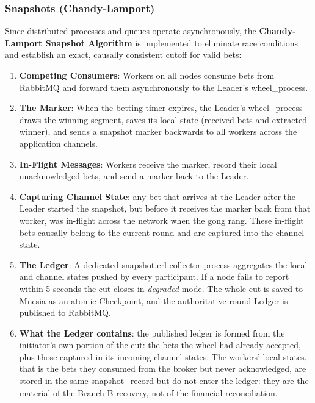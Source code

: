 \documentclass[12pt,a4paper]{article}
\begin{document}
\subsubsection{Snapshots (Chandy-Lamport)}
Since distributed processes and queues operate asynchronously, the \textbf{Chandy-Lamport Snapshot Algorithm} is implemented to eliminate race conditions and establish an exact, causally consistent cutoff for valid bets:
\begin{enumerate}
    \item \textbf{Competing Consumers}: Workers on all nodes consume bets from RabbitMQ and forward them asynchronously to the Leader's wheel\_\allowbreak process.
    \item \textbf{The Marker}: When the betting timer expires, the Leader's wheel\_\allowbreak process draws the winning segment, saves its local state (received bets and extracted winner), and sends a snapshot marker backwards to all workers across the application channels.
    \item \textbf{In-Flight Messages}: Workers receive the marker, record their local unacknowledged bets, and send a marker back to the Leader.
    \item \textbf{Capturing Channel State}: any bet that arrives at the Leader after the Leader started the snapshot, but before it receives the marker back from that worker, was in-flight across the network when the gong rang. These in-flight bets causally belong to the current round and are captured into the channel state.
    \item \textbf{The Ledger}: A dedicated snapshot.erl collector process aggregates the local and channel states pushed by every participant. If a node fails to report within 5 seconds the cut closes in \textit{degraded} mode. The whole cut is saved to Mnesia as an atomic Checkpoint, and the authoritative round Ledger is published to RabbitMQ.
    \item \textbf{What the Ledger contains}: the published ledger is formed from the initiator's own portion of the cut: the bets the wheel had already accepted, plus those captured in its incoming channel states. The workers' local states, that is the bets they consumed from the broker but never acknowledged, are stored in the same snapshot\_\allowbreak record but do not enter the ledger: they are the material of the Branch B recovery, not of the financial reconciliation.
\end{enumerate}
\end{document}
